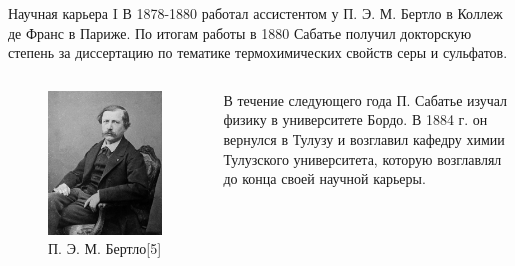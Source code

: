 \documentclass[hyperref={pdfpagelabel=false},usepdftitle=false,xcolor=dvipsnames]{beamer}
\begin{document}
\begin{frame}{Научная карьера I}
	В 1878-1880 работал ассистентом у П. Э. М. Бертло в Коллеж де Франс в Париже. По итогам работы в 1880 Сабатье получил докторскую степень за диссертацию по тематике термохимических свойств серы и сульфатов. 
	\begin{columns}
	\begin{column}{0.5\linewidth}
	\begin{figure}
		\includegraphics[width=0.6\linewidth]{pictures/berthelot.jpg}
		\caption{П. Э. М. Бертло[5]}
	\end{figure}
	\end{column}
	\begin{column}{0.5\linewidth}
		В течение следующего года П. Сабатье изучал физику в университете Бордо. В 1884 г. он вернулся в Тулузу и возглавил кафедру химии Тулузского университета, которую возглавлял до конца своей научной карьеры. 
	\end{column}
	\end{columns}
\end{frame}
\end{document}
